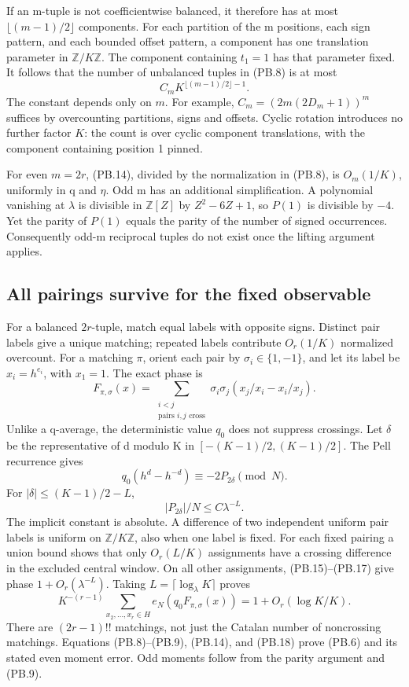 If an m-tuple is not coefficientwise balanced, it therefore has at most \(\lfloor(m-1)/2\rfloor\) components. For each partition of the m positions, each sign pattern, and each bounded offset pattern, a component has one translation parameter in \(\mathbb Z/K\mathbb Z\). The component containing \(t_1=1\) has that parameter fixed. It follows that the number of unbalanced tuples in (PB.8) is at most \[
 C_m K^{\lfloor(m-1)/2\rfloor-1}. \tag{PB.14}
\] The constant depends only on \(m\). For example, \(C_m=(2m(2D_m+1))^m\) suffices by overcounting partitions, signs and offsets. Cyclic rotation introduces no further factor \(K\): the count is over cyclic component translations, with the component containing position 1 pinned.

For even \(m=2r\), (PB.14), divided by the normalization in (PB.8), is \(O_m(1/K)\), uniformly in q and \(\eta\). Odd m has an additional simplification. A polynomial vanishing at \(\lambda\) is divisible in \(\mathbb Z[Z]\) by \(Z^2-6Z+1\), so \(P(1)\) is divisible by \(-4\). Yet the parity of \(P(1)\) equals the parity of the number of signed occurrences. Consequently odd-m reciprocal tuples do not exist once the lifting argument applies.

\subsection{All pairings survive for the fixed observable}\label{pell_blocks:all-pairings-survive-for-the-fixed-observable}

For a balanced \(2r\)-tuple, match equal labels with opposite signs. Distinct pair labels give a unique matching; repeated labels contribute \(O_r(1/K)\) normalized overcount. For a matching \(\pi\), orient each pair by \(\sigma_i\in\{1,-1\}\), and let its label be \(x_i=h^{e_i}\), with \(x_1=1\). The exact phase is \[
 F_{\pi,\sigma}(x)=
 \sum_{\substack{i<j\\\text{pairs }i,j\text{ cross}}}
 \sigma_i\sigma_j(x_j/x_i-x_i/x_j). \tag{PB.15}
\] Unlike a q-average, the deterministic value \(q_0\) does not suppress crossings. Let \(\delta\) be the representative of d modulo K in \([-(K-1)/2,(K-1)/2]\). The Pell recurrence gives \[
 q_0(h^d-h^{-d})\equiv-2P_{2\delta}\pmod N. \tag{PB.16}
\] For \(|\delta|\leq(K-1)/2-L\), \[
 |P_{2\delta}|/N\leq C\lambda^{-L}. \tag{PB.17}
\] The implicit constant is absolute. A difference of two independent uniform pair labels is uniform on \(\mathbb Z/K\mathbb Z\), also when one label is fixed. For each fixed pairing a union bound shows that only \(O_r(L/K)\) assignments have a crossing difference in the excluded central window. On all other assignments, (PB.15)--(PB.17) give phase \(1+O_r(\lambda^{-L})\). Taking \(L=\lceil\log_\lambda K\rceil\) proves \[
 K^{-(r-1)}\sum_{x_2,\ldots,x_r\in H}
 e_N(q_0 F_{\pi,\sigma}(x))
 =1+O_r(\log K/K). \tag{PB.18}
\] There are \((2r-1)!!\) matchings, not just the Catalan number of noncrossing matchings. Equations (PB.8)--(PB.9), (PB.14), and (PB.18) prove (PB.6) and its stated even moment error. Odd moments follow from the parity argument and (PB.9).

